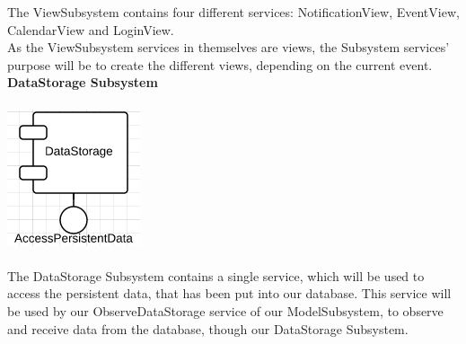 The ViewSubsystem contains four different services: NotificationView, EventView, CalendarView and LoginView.\\

As the ViewSubsystem services in themselves are views, the Subsystem services' purpose will be to create the different views, depending on the current event.\\


\textbf{DataStorage Subsystem}\\\\
\includegraphics[scale=0.8]{DatastorageServices}\\\\

The DataStorage Subsystem contains a single service, which will be used to access the persistent data, that has been put into our database. This service will be used by our ObserveDataStorage service of our ModelSubsystem, to observe and receive data from the database, though our DataStorage Subsystem.